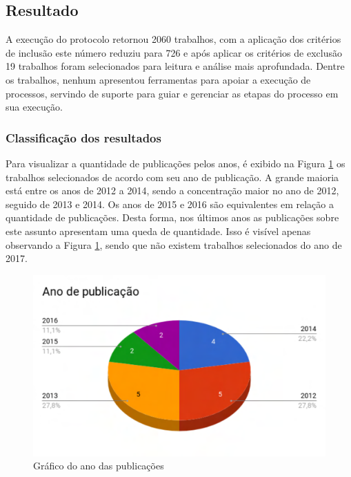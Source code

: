 \subsection{Resultado}\label{sub:trabalhosRelacionados_resultados}
A execução do protocolo retornou 2060 trabalhos, com a aplicação dos critérios de inclusão este número reduziu para 726 e após aplicar os critérios de exclusão 19 trabalhos foram selecionados para leitura e análise mais aprofundada. Dentre os trabalhos, nenhum apresentou ferramentas para apoiar a execução de processos, servindo de suporte para guiar e gerenciar as etapas do processo em sua execução.


\subsubsection{Classificação dos resultados}
Para visualizar a quantidade de publicações pelos anos, é exibido na Figura \ref{fig:ano} os trabalhos selecionados de acordo com seu ano de publicação. A grande maioria está entre os anos de 2012 a 2014, sendo a concentração maior no ano de 2012, seguido de 2013 e 2014. Os anos de 2015 e 2016 são equivalentes em relação a quantidade de publicações. Desta forma, nos últimos anos as publicações sobre este assunto apresentam uma queda de quantidade. Isso é visível apenas observando a Figura \ref{fig:ano}, sendo que não existem trabalhos selecionados do ano de 2017.
\begin{figure}[!htb]
	\caption{Gráfico do ano das publicações}\label{fig:ano}
	\begin{center}
		\includegraphics[scale=0.4]{img/GrafAno}
	\end{center}
\end{figure}

